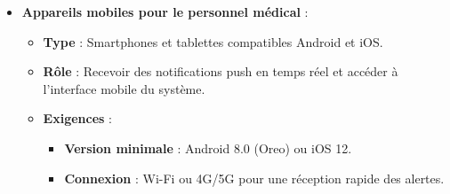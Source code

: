 \begin{itemize}
    \item \textbf{Appareils mobiles pour le personnel médical} :
    \begin{itemize}
        \item \textbf{Type} : Smartphones et tablettes compatibles Android et iOS.
        \item \textbf{Rôle} : Recevoir des notifications push en temps réel et accéder à l'interface mobile du système.
        \item \textbf{Exigences} :
        \begin{itemize}
            \item \textbf{Version minimale} : Android 8.0 (Oreo) ou iOS 12.
            \item \textbf{Connexion} : Wi-Fi ou 4G/5G pour une réception rapide des alertes.
        \end{itemize}
    \end{itemize}
\end{itemize}